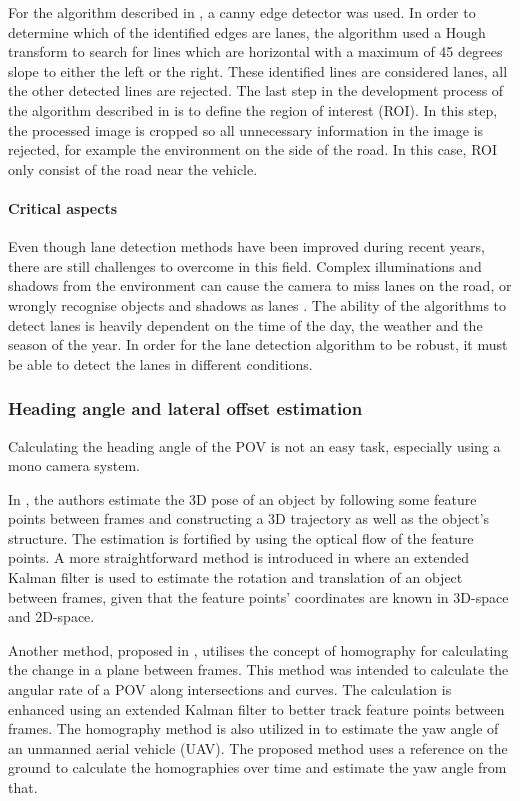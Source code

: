 For the algorithm described in \cite{Compvision}, a canny edge detector was used. In order to determine which of the identified edges are lanes, the algorithm \cite{Compvision} used a Hough transform to search for lines which are horizontal with a maximum of 45 degrees slope to either the left or the right. These identified lines are considered lanes, all the other detected lines are rejected. The last step in the development process of the algorithm described in \cite{Compvision} is to define the region of interest (ROI).  In this step, the processed image is cropped so all unnecessary information in the image is rejected, for example the environment on the side of the road. In this case, ROI only consist of the road near the vehicle.

\paragraph{Critical aspects} 
Even though lane detection methods have been improved during recent years, there are still challenges to overcome in this field. Complex illuminations and shadows from the environment can cause the camera to miss lanes on the road, or wrongly recognise objects and shadows as lanes \cite{Compvision}. The ability of the algorithms to detect lanes is heavily dependent on the time of the day, the weather and the season of the year. In order for the lane detection algorithm to be robust, it must be able to detect the lanes in different conditions.

\subsubsection{Heading angle and lateral offset estimation}
Calculating the heading angle of the POV is not an easy task, especially using a mono camera system. 

In \cite{3dtrajectory}, the authors estimate the 3D pose of an object by following some feature points between frames and constructing a 3D trajectory as well as the object's structure. The estimation is fortified by using the optical flow of the feature points. A more straightforward method is introduced in \cite{realtimePoseEstimation} where an extended Kalman filter is used to estimate the rotation and translation of an object between frames, given that the feature points' coordinates are known in 3D-space and 2D-space.

Another method, proposed in \cite{FeatureBasedHomography}, utilises the concept of homography for calculating the change in a plane between frames. This method was intended to calculate the angular rate of a POV along intersections and curves. The calculation is enhanced using an extended Kalman filter to better track feature points between frames. The homography method is also utilized in \cite{UAVPoseEstimation} to estimate the yaw angle of an unmanned aerial vehicle (UAV). The proposed method uses a reference on the ground to calculate the homographies over time and estimate the yaw angle from that.

